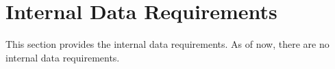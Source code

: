 \KNEADSECTIONNEWPAGE
\section{Internal Data Requirements}
\label{lab:sec_InternalData}
% 

This section provides the internal data requirements. As of now, there are no internal data requirements. 




% 



% 

